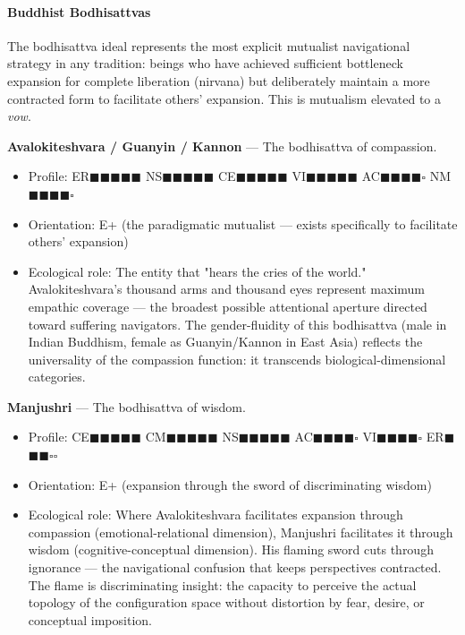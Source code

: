 \paragraph*{Buddhist Bodhisattvas}


The bodhisattva ideal represents the most explicit mutualist navigational strategy in any tradition: beings who have achieved sufficient bottleneck expansion for complete liberation (nirvana) but deliberately maintain a more contracted form to facilitate others' expansion. This is mutualism elevated to a \textit{vow}.


\textbf{Avalokiteshvara / Guanyin / Kannon} — The bodhisattva of compassion.

\begin{itemize}[nosep,leftmargin=*]
  \item Profile: ER$\blacksquare$$\blacksquare$$\blacksquare$$\blacksquare$$\blacksquare$ NS$\blacksquare$$\blacksquare$$\blacksquare$$\blacksquare$$\blacksquare$ CE$\blacksquare$$\blacksquare$$\blacksquare$$\blacksquare$$\blacksquare$ VI$\blacksquare$$\blacksquare$$\blacksquare$$\blacksquare$$\blacksquare$ AC$\blacksquare$$\blacksquare$$\blacksquare$$\blacksquare$$\square$ NM$\blacksquare$$\blacksquare$$\blacksquare$$\blacksquare$$\square$
  \item Orientation: E+ (the paradigmatic mutualist — exists specifically to facilitate others' expansion)
  \item Ecological role: The entity that "hears the cries of the world." Avalokiteshvara's thousand arms and thousand eyes represent maximum empathic coverage — the broadest possible attentional aperture directed toward suffering navigators. The gender-fluidity of this bodhisattva (male in Indian Buddhism, female as Guanyin/Kannon in East Asia) reflects the universality of the compassion function: it transcends biological-dimensional categories.
\end{itemize}


\textbf{Manjushri} — The bodhisattva of wisdom.

\begin{itemize}[nosep,leftmargin=*]
  \item Profile: CE$\blacksquare$$\blacksquare$$\blacksquare$$\blacksquare$$\blacksquare$ CM$\blacksquare$$\blacksquare$$\blacksquare$$\blacksquare$$\blacksquare$ NS$\blacksquare$$\blacksquare$$\blacksquare$$\blacksquare$$\blacksquare$ AC$\blacksquare$$\blacksquare$$\blacksquare$$\blacksquare$$\square$ VI$\blacksquare$$\blacksquare$$\blacksquare$$\blacksquare$$\square$ ER$\blacksquare$$\blacksquare$$\blacksquare$$\square$$\square$
  \item Orientation: E+ (expansion through the sword of discriminating wisdom)
  \item Ecological role: Where Avalokiteshvara facilitates expansion through compassion (emotional-relational dimension), Manjushri facilitates it through wisdom (cognitive-conceptual dimension). His flaming sword cuts through ignorance — the navigational confusion that keeps perspectives contracted. The flame is discriminating insight: the capacity to perceive the actual topology of the configuration space without distortion by fear, desire, or conceptual imposition.
\end{itemize}


